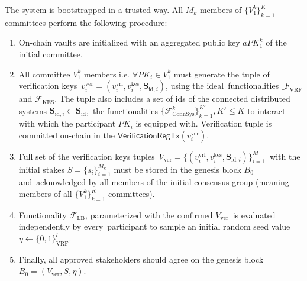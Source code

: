 The system is bootstrapped in a trusted way.
All $M_k$ members of $\{V^k_1\}_{k=1}^K$ committees perform the following procedure:
\begin{enumerate}
    \item On-chain vaults are initialized with an aggregated public key $aPK^k_1$ of the initial committee.

    \item All committee $V^k_1$ members i.e. ${\forall PK_i \in V^k_1}$ must generate the tuple of verification keys\
    ${v_i^{\text{ver}} = (v_i^{\text{vrf}}, v_i^{\text{kes}}, \mathbf{S}_{\text{id}, i})}$, using the ideal\
    functionalities ${\mathcal_{F}}_{\text{VRF}}$ and ${\mathcal{F}}_{\text{KES}}$.
    The tuple also includes a set of ids of the connected distributed systems $\mathbf{S}_{\text{id}, i} \subset \mathbf{S}_{\text{id}}$,\
    the functionalities ${\{\mathcal{F}^k_{\text{ConnSys}}\}_{k=1}^{K'}, K' \leq K}$ to interact with which the participant $PK_i$ is equipped with.
    Verification tuple is committed on-chain in the $\textsf{VerificationRegTx}(v_i^{\text{ver}})$.

    \item Full set of the verification keys tuples\
    ${V_{\text{ver}} = \{(v_i^{\text{vrf}}, v_i^{\text{kes}}, \mathbf{S}_{\text{id}, i})\}_{i=1}^{M}}$\
    with the initial stakes $S = \{s_i\}_{i=1}^{M_k}$ must be stored in the genesis block $B_0$ and\
    acknowledged by all members of the initial consensus group (meaning members of all $\{V^k_1\}_{k=1}^K$ committees).

    \item Functionality ${\mathcal{F}}_{\text{LB}}$, parameterized with the confirmed $V_\text{ver}$\
    is evaluated independently by every\
    participant to sample an initial random seed value $\eta \leftarrow \{0, 1\}^l_{\text{VRF}}$.

    \item Finally, all approved stakeholders should agree on the genesis block\
    ${B_0=\left(V_{\text{ver}}, S, \eta\right)}$.
\end{enumerate}

